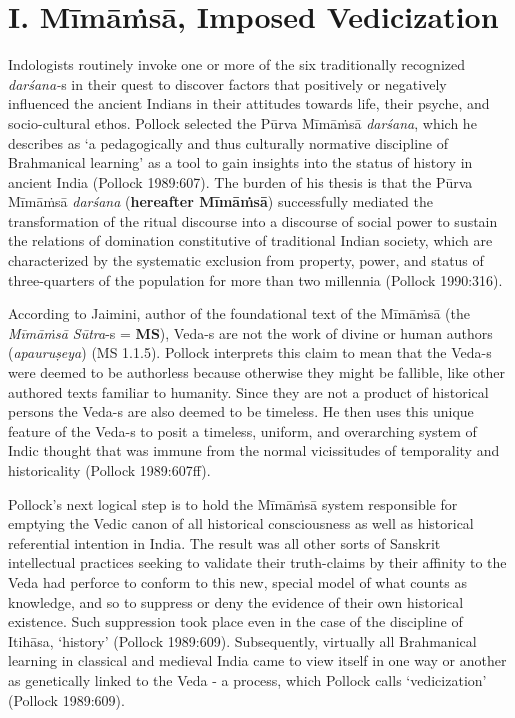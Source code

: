 \section*{I. Mīmāṁsā, Imposed Vedicization}

Indologists routinely invoke one or more of the six traditionally recognized \textit{darśana-}s in their quest to discover factors that positively or negatively influenced the ancient Indians in their attitudes towards life, their psyche, and socio-cultural ethos. Pollock selected the Pūrva Mīmāṁsā \textit{darśana}, which he describes as ‘a pedagogically and thus culturally normative discipline of Brahmanical learning’ as a tool to gain insights into the status of history in ancient India (Pollock 1989:607). The burden of his thesis is that the Pūrva Mīmāṁsā \textit{darśana} (\textbf{hereafter Mīmāṁsā}) successfully mediated the transformation of the ritual discourse into a discourse of social power to sustain the relations of domination constitutive of traditional Indian society, which are characterized by the systematic exclusion from property, power, and status of three-quarters of the population for more than two millennia (Pollock 1990:316).

According to Jaimini, author of the foundational text of the Mīmāṁsā (the \textit{Mīmāṁsā Sūtra}-s = \textbf{MS}), Veda-s are not the work of divine or human authors (\textit{apauruṣeya}) (MS 1.1.5). Pollock interprets this claim to mean that the Veda-s were deemed to be authorless because otherwise they might be fallible, like other authored texts familiar to humanity. Since they are not a product of historical persons the Veda-s are also deemed to be timeless. He then uses this unique feature of the Veda-s to posit a timeless, uniform, and overarching system of Indic thought that was immune from the normal vicissitudes of temporality and historicality (Pollock 1989:607ff).

Pollock’s next logical step is to hold the Mīmāṁsā system responsible for emptying the Vedic canon of all historical consciousness as well as historical referential intention in India. The result was all other sorts of Sanskrit intellectual practices seeking to validate their truth-claims by their affinity to the Veda had perforce to conform to this new, special model of what counts as knowledge, and so to suppress or deny the evidence of their own historical existence. Such suppression took place even in the case of the discipline of Itihāsa, ‘history’ (Pollock 1989:609). Subsequently, virtually all Brahmanical learning in classical and medieval India came to view itself in one way or another as genetically linked to the Veda - a process, which Pollock calls ‘vedicization’ (Pollock 1989:609).

